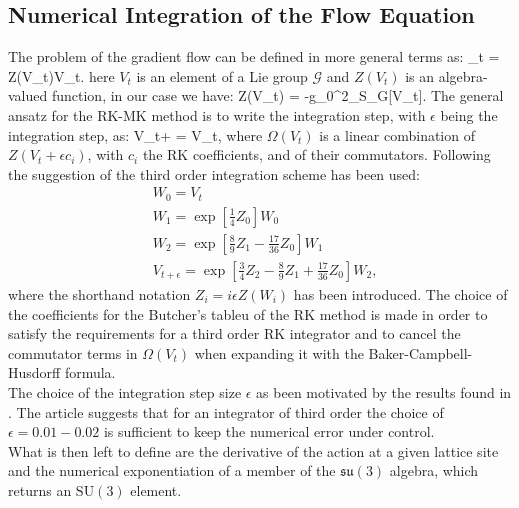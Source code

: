 \subsection{Numerical Integration of the Flow Equation}
The problem of the gradient flow can be defined in more general terms as:
\beq
    _t =  Z(V_t)V_t.
\eeq
here $V_t$ is an element of a Lie group $\mathcal{G}$ and $Z(V_t)$ is an algebra-valued function, in our case we have:
\beq 
Z(V_t) = -g_0^2\partial_\mu S_G[V_t].
\label{eq:flow_action}
\eeq
The general ansatz for the RK-MK method is to write the integration step, with $\epsilon$ being the integration step, as:
\beq
    V_{t+\epsilon} =   V_t,
\eeq
where $\Omega(V_t)$ is a linear combination of $Z(V_t + \epsilon c_i)$, with $c_i$ the RK coefficients, and of their commutators. Following the suggestion of \cite{luscher_properties_2010} the third order integration scheme  has been used:
\begin{align}
    \label{eq:integrator}
    &W_0 = V_t\\\nonumber
    &W_1 = \exp\left[ \frac{1}{4}Z_0 \right] W_0 \\\nonumber
    &W_2 = \exp\left[ \frac{8}{9}Z_1 - \frac{17}{36}Z_0 \right] W_1\\\nonumber
    &V_{t+\epsilon} = \exp\left[ \frac{3}{4}Z_2 - \frac{8}{9}Z_1 + \frac{17}{36}Z_0\right] W_2,
\end{align}
where the shorthand notation $Z_i = i\epsilon Z(W_i)$ has been introduced. The choice of the coefficients for the Butcher's tableu \cite{_numerical_????} of the RK method is made in order to satisfy the requirements for a third order RK integrator and to cancel the commutator terms in $\Omega(V_t)$ when expanding it with the Baker-Campbell-Husdorff formula. \\
The choice of the integration step size $\epsilon$ as been motivated by the results found in \cite{ce_testing_2015}. The article suggests that for an integrator of third order the choice of $\epsilon=0.01-0.02$ is sufficient to keep the numerical error under control.\\
What is then left to define are the derivative of the action at a given lattice site and the numerical exponentiation of a member of the $\mathfrak{su}(3)$ algebra, which returns an $\mathrm{SU}(3)$ element.

